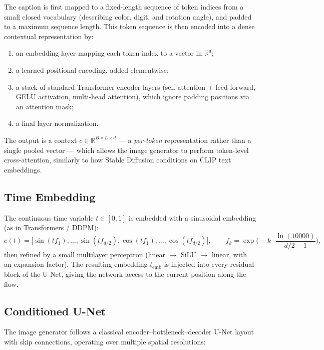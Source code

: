 \documentclass[11pt,a4paper]{article}
\begin{document}
The caption is first mapped to a fixed-length sequence of token indices from
a small closed vocabulary (describing color, digit, and rotation angle), and
padded to a maximum sequence length. This token sequence is then encoded
into a dense contextual representation by:

\begin{enumerate}
  \item an embedding layer mapping each token index to a vector in
        $\mathbb{R}^{d}$;
  \item a learned positional encoding, added elementwise;
  \item a stack of standard Transformer encoder layers (self-attention +
        feed-forward, GELU activation, multi-head attention), which ignore
        padding positions via an attention mask;
  \item a final layer normalization.
\end{enumerate}

The output is a context $c \in \mathbb{R}^{B \times L \times d}$ — a
\emph{per-token} representation rather than a single pooled vector — which
allows the image generator to perform token-level cross-attention, similarly
to how Stable Diffusion conditions on CLIP text embeddings.

\subsection{Time Embedding}

The continuous time variable $t \in [0,1]$ is embedded with a sinusoidal
embedding (as in Transformers / DDPM):
\[
  e(t) = \big[\sin(t f_1), \dots, \sin(t f_{d/2}), \cos(t f_1), \dots,
  \cos(t f_{d/2})\big], \qquad
  f_k = \exp\!\Big(-k \cdot \frac{\ln(10000)}{d/2 - 1}\Big),
\]
then refined by a small multilayer perceptron (linear $\to$ SiLU $\to$
linear, with an expansion factor). The resulting embedding $t_{\mathrm{emb}}$
is injected into every residual block of the U-Net, giving the network
access to the current position along the flow.

\subsection{Conditioned U-Net}

The image generator follows a classical encoder–bottleneck–decoder U-Net
layout with skip connections, operating over multiple spatial resolutions:
\end{document}
